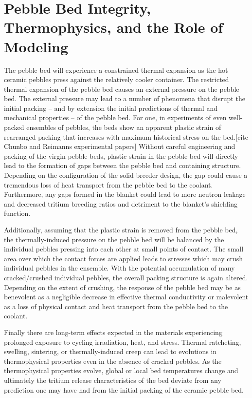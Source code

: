 \section{Pebble Bed Integrity, Thermophysics, and the Role of Modeling}\label{sec:intro-bed-integrity}

The pebble bed will experience a constrained thermal expansion as the hot ceramic pebbles press against the relatively cooler container. The restricted thermal expansion of the pebble bed causes an external pressure on the pebble bed. The external pressure may lead to a number of phenomena that disrupt the initial packing -- and by extension the initial predictions of thermal and mechanical properties -- of the pebble bed. For one, in experiments of even well-packed ensembles of pebbles, the beds show an apparent plastic strain of rearranged packing that increases with maximum historical stress on the bed.[cite Chunbo and Reimanns experimental papers] Without careful engineering and packing of the virgin pebble beds, plastic strain in the pebble bed will directly lead to the formation of gaps between the pebble bed and containing structure. Depending on the configuration of the solid breeder design, the gap could cause a tremendous loss of heat transport from the pebble bed to the coolant. Furthermore, any gaps formed in the blanket could lead to more neutron leakage and decreased tritium breeding ratios and detriment to the blanket's shielding function.

Additionally, assuming that the plastic strain is removed from the pebble bed, the thermally-induced pressure on the pebble bed will be balanced by the individual pebbles pressing into each other at small points of contact. The small area over which the contact forces are applied leads to stresses which may crush individual pebbles in the ensemble. With the potential accumulation of many cracked/crushed individual pebbles, the overall packing structure is again altered. Depending on the extent of crushing, the response of the pebble bed may be as benevolent as a negligible decrease in effective thermal conductivity or malevolent as a loss of physical contact and heat transport from the pebble bed to the coolant. 

Finally there are long-term effects expected in the materials experiencing prolonged exposure to cycling irradiation, heat, and stress. Thermal ratcheting, swelling, sintering, or thermally-induced creep can lead to evolutions in thermophysical properties even in the absence of cracked pebbles. As the thermophysical properties evolve, global or local bed temperatures change and ultimately the tritium release characteristics of the bed deviate from any prediction one may have had from the initial packing of the ceramic pebble bed. 

